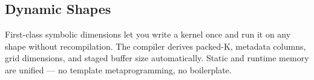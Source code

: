 \subsection*{Dynamic Shapes}

First-class symbolic dimensions let you write a kernel once and run it on any shape without recompilation. The compiler derives packed-K, metadata columns, grid dimensions, and staged buffer size automatically. Static and runtime memory are unified --- no template metaprogramming, no boilerplate.

